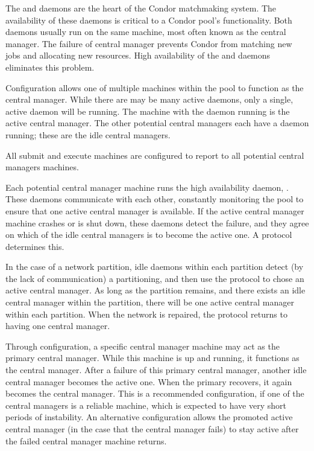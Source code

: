 The  and  daemons
are the heart of the Condor matchmaking system.
The availability of these daemons is critical to a Condor pool's
functionality.
Both daemons usually run on the same machine,
most often known as the central manager.
The failure of central manager prevents Condor from matching
new jobs and allocating new resources. 
High availability of the  and  daemons
eliminates this problem. 

Configuration allows one of 
multiple machines within the pool to function as the central manager.
While there are may be many active  daemons,
only a single, active  daemon will be running.
The machine with the  daemon running is
the active central manager.
The other potential central managers each
have a  daemon running;
these are the idle central managers.

All submit and execute machines are configured to report
to all potential central managers machines.

Each potential central manager machine runs the high
availability daemon, .
These daemons communicate with each other,
constantly monitoring the pool to ensure that one active central
manager is available.
If the active central manager machine crashes or is shut down,
these daemons detect the failure,
and they agree on
which of the idle central managers is to become the active one.
A protocol determines this.

In the case of a network partition,
idle  daemons within each partition
detect (by the lack of communication) a partitioning,
and then use the protocol to chose an active central manager.
As long as the partition remains, 
and there exists an idle central manager within the partition,
there will be one active central manager within each partition.
When the network is repaired,
the protocol returns to having one central manager.

Through configuration,
a specific central manager machine may act as the
primary central manager.
While this machine is up and running, 
it functions as the central manager.
After a failure of this primary central manager,
another idle central manager becomes the active one.
When the primary recovers,
it again becomes the central manager.
This is a recommended configuration,
if one of the central managers is a reliable machine,
which is expected to have very short periods of instability.
An alternative configuration allows the promoted 
active central manager 
(in the case that the central manager fails)
to stay active after the failed central manager machine
returns.

